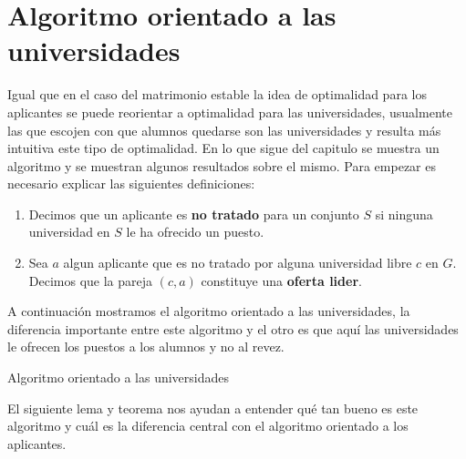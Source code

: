 \section{Algoritmo orientado a las universidades}

Igual que en el caso del matrimonio estable la idea de optimalidad para los aplicantes se puede reorientar a optimalidad para las universidades, usualmente las que escojen con que alumnos quedarse son las universidades y resulta más intuitiva este tipo de optimalidad. En lo que sigue del capitulo se muestra un algoritmo y se muestran algunos resultados sobre el mismo. Para empezar es necesario explicar las siguientes definiciones:
\begin{enumerate}
\item Decimos que un aplicante es \textbf{no tratado} para un conjunto $S$ si ninguna universidad en $S$ le ha ofrecido un puesto.
\item Sea $a$ algun aplicante que es no tratado por alguna universidad libre $c$ en $G$. Decimos que la pareja $(c,a)$ constituye una \textbf{oferta lider}.
\end{enumerate}

A continuación mostramos el algoritmo orientado a las universidades, la diferencia importante entre este algoritmo y el otro es que aquí las universidades le ofrecen los puestos a los alumnos y no al revez.

\IncMargin{1em}
\begin{Algoritmo}[H]

\BlankLine
{}
\caption{Algoritmo orientado a las universidades}
\end{Algoritmo}
\DecMargin{1em}

El siguiente lema y teorema nos ayudan a entender qué tan bueno es este algoritmo y cuál es la diferencia central con el algoritmo orientado a los aplicantes. 


